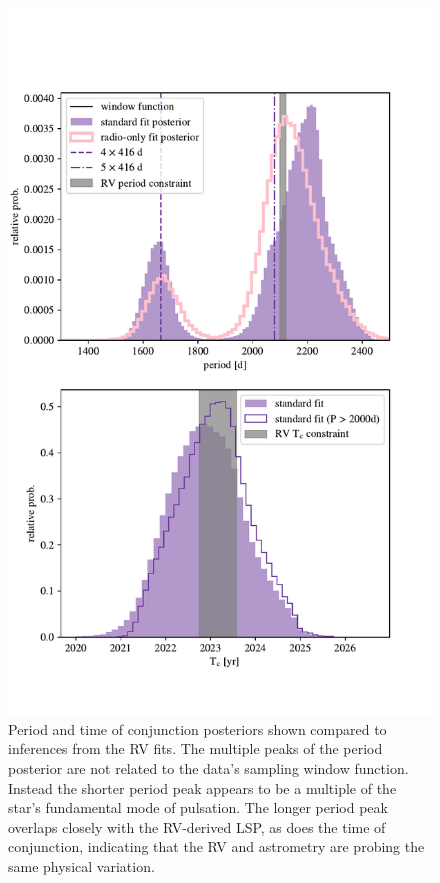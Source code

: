 \documentclass[twocolumn]{aastex631}
\begin{document}
\begin{figure}
    \centering
    \includegraphics[width=\linewidth]{figures/period_window.pdf}
    \caption{Period and time of conjunction posteriors shown compared to inferences from the RV fits. The multiple peaks of the period posterior are not related to the data's sampling window function. Instead the shorter period peak appears to be a multiple of the star's fundamental mode of pulsation. The longer period peak overlaps closely with the RV-derived LSP, as does the time of conjunction, indicating that the RV and astrometry are probing the same physical variation.  }
    \label{fig:window-func}
\end{figure}
\end{document}

